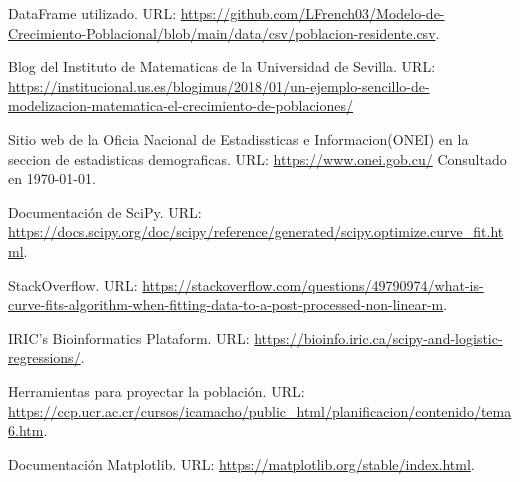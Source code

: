 \documentclass[a4paper,10pt,twocolumn]{article}
\begin{document}
\begin{thebibliography}{99}
	 DataFrame utilizado. URL: \url{https://github.com/LFrench03/Modelo-de-Crecimiento-Poblacional/blob/main/data/csv/poblacion-residente.csv}.

	 Blog del Instituto de Matematicas de la Universidad de Sevilla. URL: \url{https://institucional.us.es/blogimus/2018/01/un-ejemplo-sencillo-de-modelizacion-matematica-el-crecimiento-de-poblaciones/}

	 Sitio web de la Oficia Nacional de Estadissticas e Informacion(ONEI) en la seccion de
	estadisticas demograficas. URL: \url{https://www.onei.gob.cu/}
	Consultado en \today.

	 Documentación de SciPy. URL: \url{https://docs.scipy.org/doc/scipy/reference/generated/scipy.optimize.curve_fit.html}.

	 StackOverflow. URL: \url{https://stackoverflow.com/questions/49790974/what-is-curve-fits-algorithm-when-fitting-data-to-a-post-processed-non-linear-m}.

	 IRIC's Bioinformatics Plataform. URL: \url{https://bioinfo.iric.ca/scipy-and-logistic-regressions/}.

	 Herramientas para proyectar la población. URL: \url{https://ccp.ucr.ac.cr/cursos/icamacho/public_html/planificacion/contenido/tema6.htm}.

	 Documentación Matplotlib. URL: \url{https://matplotlib.org/stable/index.html}.

\end{thebibliography}
\end{document}

